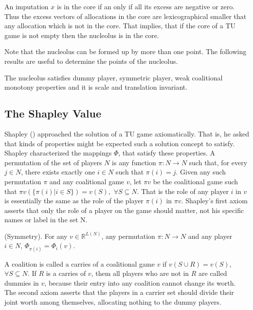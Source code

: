 An imputation $x$ is in the core if an only if all its excess are negative or zero. Thus the excess vectors of allocations in the core are lexicographical smaller that any allocation which is not in the core. That implies, that if the core of a TU game is not empty then the nucleolus is in the core. 

Note that the nucleolus can be formed up by more than one point. The following results are useful to determine the points of the nucleolus.


\begin{theorem}
	The nucleolus satisfies dummy player, symmetric player, weak coalitional monotony properties and it is scale and translation invariant.
\end{theorem}



\subsection{The Shapley Value}\label{subShapley}

Shapley (\cite{Shapley}) approached the solution of a TU game axiomatically. That is, he asked that kinds of properties might be expected such a solution concept to satisfy. Shapley characterized the mappings $\Phi$, that satisfy these properties. A permutation of the set of players $N$ is any function $\pi : N \rightarrow N$ such that, for every $j \in N$, there exists exactly one $i \in N$ such that $\pi(i)=j$. Given any such permutation $\pi$ and any coalitional game $v$, let $\pi v$ be the coalitional game such that $\pi v ( \{\pi(i) | i \in S \}) = v (S),$ $\forall S \subseteq N$. That is the role of any player $i$ in $v$ is essentially the same as the role of the player $\pi (i)$ in $\pi v$. Shapley's first axiom asserts that only the role of a player on the game should matter, not his specific names or label in the set N.

\begin{axiom}
	(Symmetry). For any $ v \in \mathbb{R}^{L(N)}$, any permutation $\pi: N \rightarrow N$ and any player $i \in N$, $\Phi_{\pi(i)} = \Phi_{i}(v)$.
\end{axiom}

A coalition is called a carries of a coalitional game $v$ if $v( S \cup R) = v(S) $, $\forall S \subseteq N$.
If $R$ is a carries of $v$, them all players who are not in $R$ are called dummies in $v$, because their entry into any coalition cannot change its worth. The second axiom asserts that the players in a carrier set should divide their joint worth among themselves, allocating nothing to the dummy players.


